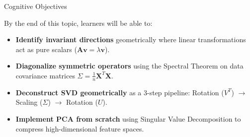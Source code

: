\documentclass[../m00-session-02.tex]{subfiles}
\begin{document}

\begin{frame}{Cognitive Objectives}
  \begin{LearningObjectives}{By the end of this topic, learners will be able to:}
    \begin{itemize}\setlength{\itemsep}{0.28em}
      \item \textbf{Identify invariant directions} geometrically where linear transformations act as pure scalars ($\mathbf{A}\mathbf{v} = \lambda\mathbf{v}$).
      \item \textbf{Diagonalize symmetric operators} using the Spectral Theorem on data covariance matrices $\Sigma = \frac{1}{n}\mathbf{X}^T\mathbf{X}$.
      \item \textbf{Deconstruct SVD geometrically} as a 3-step pipeline: Rotation ($V^T$) $\to$ Scaling ($\Sigma$) $\to$ Rotation ($U$).
      \item \textbf{Implement PCA from scratch} using Singular Value Decomposition to compress high-dimensional feature spaces.
    \end{itemize}
  \end{LearningObjectives}
\end{frame}
\end{document}
